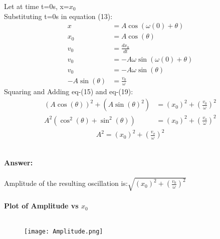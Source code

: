 \documentclass[journal,12pt,twocolumn]{IEEEtran}
\theoremstyle{remark}
\begin{document}
\begin{enumerate}
Let at time t=0s, x=$x_0$\\
Substituting t=0s in equation (13):
\begin{align}
x&=A\cos(\omega{(0)}+\theta{})\\
x_0&=A\cos(\theta{})\\
v_0&=\frac{dx_0}{dt}\\
v_0&=-A\omega{}\sin(\omega{(0)}+\theta{})\\
v_0&=-A\omega{}\sin(\theta{})\\
-A\sin(\theta{})&=\frac{v_0}{\omega{}}
\end{align}
Squaring and Adding eq-(15) and eq-(19):\\
\begin{align}
(A\cos(\theta{}))^2+(A\sin(\theta{})^2)
&=(x_0)^2+\left(\frac{v_0}{\omega{}}\right)^2\\
A^2(\cos^2(\theta{})+\sin^2(\theta{}))
&=(x_0)^2+\left(\frac{v_o}{\omega{}}\right)^2\end{align}
\begin{align}
A^2=(x_0)^2+(\frac{v_o}{\omega{}})^2
\end{align}
\end{enumerate}\\
\textbf{Answer:}\\ \\
Amplitude of the resulting oscillation is:$\sqrt{(x_0)^2+(\frac{v_0}{\omega{}})^2}$\\ \\
\textbf{Plot of Amplitude vs $x_0$}\\ \\
\begin{figure}[h]
        \centering
\texttt{[image: Amplitude.png]}
    \end{figure}
\end{document}
